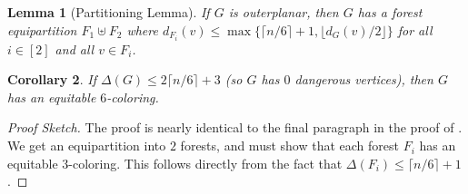 \documentclass[11pt]{article}
\newtheorem{lem}{Lemma}
\newtheorem{cor}[lem]{Corollary}
\theoremstyle{definition}
\newcommand\floor[1]{\lfloor#1\rfloor}
\newcommand\ceil[1]{\lceil#1\rceil}
\renewcommand\le\leqslant
\begin{document}
\begin{lem}[Partitioning Lemma]
	If $G$ is outerplanar, then $G$ has a forest equipartition $F_1\uplus F_2$ where 
	$d_{F_i}(v)\le \max\{\ceil{n/6}+1,\floor{d_G(v)/2}\}$ for all $i\in[2]$ and all $v\in F_i$.
	\label{partitioning-lem}
\end{lem}
\begin{cor}
	If $\Delta(G)\le 2\ceil{n/6}+3$ (so $G$ has $0$ dangerous vertices), then $G$ has an equitable $6$-coloring.
\end{cor}
\begin{proof}[Proof Sketch]
	The proof is nearly identical to the final paragraph in the proof of .
	We get an equipartition into $2$ forests, and must show that each forest $F_i$ has an equitable $3$-coloring.
	This follows directly from the fact that $\Delta(F_i)\le \ceil{n/6}+1$.
\end{proof}
\end{document}
